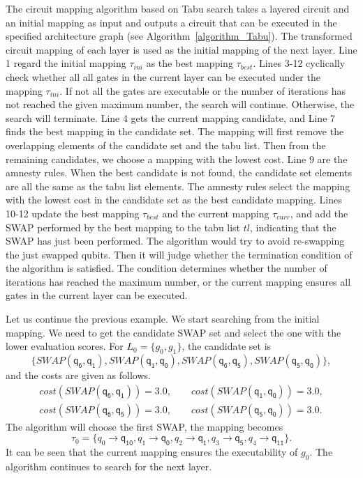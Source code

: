 \documentclass[runningheads]{llncs}
\begin{document}
	The circuit mapping algorithm based on Tabu search takes a layered circuit and an initial mapping as input and outputs a circuit that can be executed in the specified architecture graph (see Algorithm~\ref{algorithm_Tabu}). The transformed circuit mapping of each layer is used as the initial mapping of the next layer. 
	Line 1 regard the initial mapping $\tau_{ini}$ as the best mapping $\tau_{best}$. Lines 3-12 cyclically check whether all all gates in the current layer can be executed under the mapping $\tau_{ini}$. If not all the gates are executable or the number of iterations has not reached the given maximum number, the search will continue. Otherwise, the search will terminate. Line 4 gets the current mapping candidate, and Line 7 finds the best mapping in the candidate set. The mapping will first remove the overlapping elements of the candidate set and the tabu list. Then from the remaining candidates, we choose a mapping with the lowest cost. Line 9 are the amnesty rules. When the best candidate is not found, the candidate set elements are all the same as the tabu list elements. The amnesty rules select the mapping with the lowest cost in the candidate set as the best candidate mapping. Lines 10-12 update the best mapping $\tau_{best}$ and the current mapping $\tau_{curr}$, and add the SWAP performed by the best mapping to the tabu list $tl$, indicating that the SWAP has just been performed. 
	The algorithm would try to avoid re-swapping the just swapped qubits. Then it will judge whether the termination condition of the algorithm is satisfied. The condition determines whether the number of iterations has reached the maximum number, or the current mapping ensures all gates in the current layer can be executed. 
\begin{example}
Let us continue the previous example. We start searching from the initial mapping. We need to get the candidate SWAP set and select the one with the lower evaluation scores.
For $L_{0}=\{g_{0},g_{1}\}$, the candidate set is 
$$\{SWAP(\textsf{q}_\textsf{6},\textsf{q}_\textsf{1}), SWAP(\textsf{q}_\textsf{1},\textsf{q}_\textsf{0}), SWAP(\textsf{q}_\textsf{6},\textsf{q}_\textsf{5}), SWAP(\textsf{q}_\textsf{5},\textsf{q}_\textsf{0}) \} , $$ and the costs are given as follows.
\[\begin{array}{l}
cost(SWAP(\textsf{q}_\textsf{6},\textsf{q}_\textsf{1}))=3.0, \qquad cost(SWAP(\textsf{q}_\textsf{1},\textsf{q}_\textsf{0}))=3.0,\\ cost(SWAP(\textsf{q}_\textsf{6},\textsf{q}_\textsf{5}))=3.0, \qquad cost(SWAP(\textsf{q}_\textsf{5},\textsf{q}_\textsf{0}))=3.0 .
\end{array}\]
The algorithm will choose the first SWAP, the mapping becomes $$\tau_{0}=\{\textit{q}_\textit{0}\rightarrow  \textsf{q}_\textsf{10},\textit{q}_\textit{1}\rightarrow  \textsf{q}_\textsf{0},
\textit{q}_\textit{2}\rightarrow  \textsf{q}_\textsf{1},\textit{q}_\textit{3}\rightarrow  \textsf{q}_\textsf{5},\textit{q}_\textit{4}\rightarrow  \textsf{q}_\textsf{11}\} . $$ 
 It can be seen that the current mapping ensures the executability of $g_{0}$. The algorithm continues to search for the next layer.
\end{example}
\end{document}
